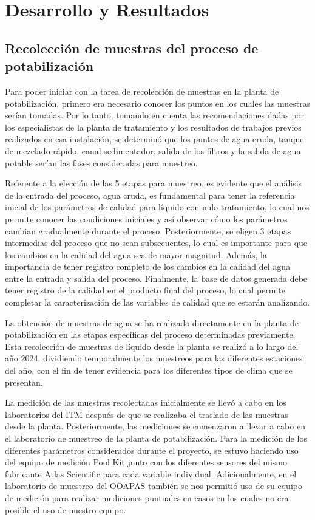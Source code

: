 \chapter{Desarrollo y Resultados} %
\label{ch:MarcoTeorico} 

\section{Recolección de muestras del proceso de potabilización}

Para poder iniciar con la tarea de recolección de muestras en la planta de potabilización, primero era necesario conocer los puntos en los cuales las muestras serían tomadas. Por lo tanto, tomando en cuenta las recomendaciones 
dadas por los especialistas de la planta de tratamiento y los resultados de trabajos previos realizados en esa instalación, se determinó que los puntos de agua cruda, tanque de mezclado rápido, canal sedimentador, salida 
de los filtros y la salida de agua potable serían las fases consideradas para muestreo.

Referente a la elección de las 5 etapas para muestreo, es evidente que el análisis de la entrada del proceso, agua cruda, es fundamental para tener la referencia inicial de los parámetros de calidad para líquido con nulo 
tratamiento, lo cual nos permite conocer las condiciones iniciales y así observar cómo los parámetros cambian gradualmente durante el proceso. Posteriormente, se eligen 3 etapas intermedias del proceso que no sean subsecuentes,
lo cual es importante para que los cambios en la calidad del agua sea de mayor magnitud. Además, la importancia de tener registro completo de los cambios en la calidad del agua entre la entrada y salida del proceso. Finalmente, 
la base de datos generada debe tener registro de la calidad en el producto final del proceso, lo cual permite completar la caracterización de las variables de calidad que se estarán analizando.

La obtención de muestras de agua se ha realizado directamente en la planta de potabilización en las etapas específicas del proceso determinadas previamente. Esta recolección de muestras de líquido desde la planta se realizó 
a lo largo del año 2024, dividiendo temporalmente los muestreos para las diferentes estaciones del año, con el fin de tener evidencia para los diferentes tipos de clima que se presentan.

La medición de las muestras recolectadas inicialmente se llevó a cabo en los laboratorios del ITM después de que se realizaba el traslado de las muestras desde la planta. Posteriormente, las mediciones se comenzaron a llevar 
a cabo en el laboratorio de muestreo de la planta de potabilización. Para la medición de los diferentes parámetros considerados durante el proyecto, se estuvo haciendo uso del equipo de medición Pool Kit junto con los diferentes 
sensores del mismo fabricante Atlas Scientific para cada variable individual. Adicionalmente, en el laboratorio de muestreo del OOAPAS también se nos permitió uso de su equipo de medición para realizar mediciones puntuales 
en casos en los cuales no era posible el uso de nuestro equipo.

